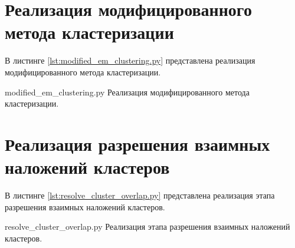 \section{Реализация модифицированного метода кластеризации}
В листинге \ref{lst:modified_em_clustering.py} представлена реализация модифицированного метода кластеризации.

{modified_em_clustering.py}
{Реализация модифицированного метода кластеризации.}

\section{Реализация разрешения взаимных наложений кластеров}
В листинге \ref{lst:resolve_cluster_overlap.py} представлена реализация этапа разрешения взаимных наложений кластеров.

{resolve_cluster_overlap.py}
{Реализация этапа разрешения взаимных наложений кластеров.}